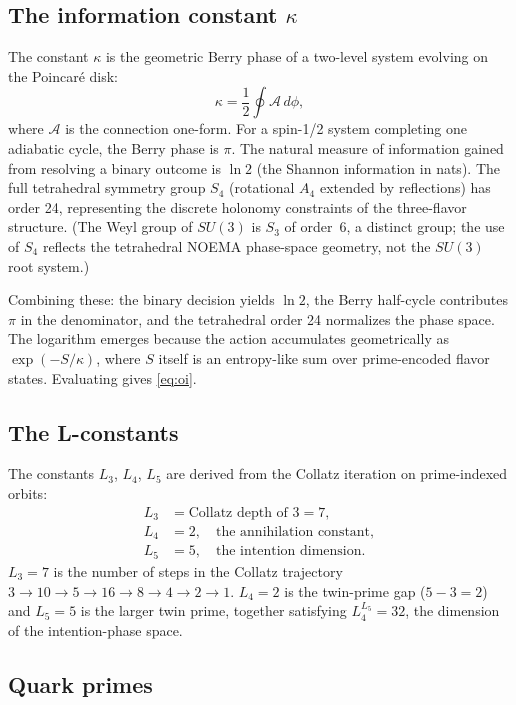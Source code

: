 \documentclass[aps,prd,reprint,twocolumn,showpacs,superscriptaddress]{revtex4-2}
\begin{document}
\subsection{The information constant $\kappa$}

The constant $\kappa$ is the geometric Berry phase of a two-level system
evolving on the Poincar\'{e} disk:
\begin{equation}
\kappa = \frac{1}{2} \oint \mathcal{A} \, d\phi,
\end{equation}
where $\mathcal{A}$ is the connection one-form.  For a spin-1/2 system
completing one adiabatic cycle, the Berry phase is $\pi$.  The natural
measure of information gained from resolving a binary outcome is
$\ln 2$ (the Shannon information in nats).  The full tetrahedral symmetry
group $S_4$ (rotational $A_4$ extended by reflections) has order 24, representing the
discrete holonomy constraints of the three-flavor structure.  (The Weyl
group of $SU(3)$ is $S_3$ of order~6, a distinct group; the use of $S_4$
reflects the tetrahedral NOEMA phase-space geometry, not the $SU(3)$ root
system.)

Combining these: the binary decision yields $\ln 2$, the Berry half-cycle
contributes $\pi$ in the denominator, and the tetrahedral order 24
normalizes the phase space.  The logarithm emerges because the action
accumulates geometrically as $\exp(-S/\kappa)$, where $S$ itself is an
entropy-like sum over prime-encoded flavor states.  Evaluating gives
\eqref{eq:oi}.

\subsection{The L-constants}

The constants $L_3$, $L_4$, $L_5$ are derived from the Collatz
iteration on prime-indexed orbits:
\begin{align}
L_3 &= \text{Collatz depth of 3} = 7, \\
L_4 &= 2,\quad \text{the annihilation constant},\\
L_5 &= 5,\quad \text{the intention dimension}.
\end{align}
$L_3 = 7$ is the number of steps in the Collatz trajectory $3 \to 10 \to
5 \to 16 \to 8 \to 4 \to 2 \to 1$.  $L_4 = 2$ is the twin-prime gap
($5 - 3 = 2$) and $L_5 = 5$ is the larger twin prime, together satisfying
$L_4^{L_5} = 32$, the dimension of the intention-phase space.

\subsection{Quark primes}
\end{document}
